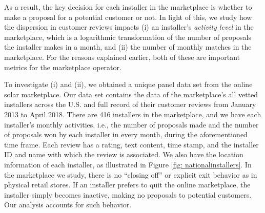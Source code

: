 \documentclass[msom,blindrev]{informs3}
\begin{document}
%	
%	
	
	As a result, the key decision for each installer in the marketplace is whether to make a proposal for a potential customer or not. In light of this, we study how the dispersion in customer reviews impacts (i) an installer's \emph{activity level} in the marketplace, which is a logarithmic transformation of the number of proposals the installer makes in a month, and (ii) the number of monthly matches in the marketplace. For the reasons explained earlier, both of these are important metrics for the marketplace operator.
	
	
	
	To investigate (i) and (ii), we obtained a unique panel data set from the online solar marketplace. Our data set contains the data of the marketplace's all vetted installers across the U.S. and full record of their customer reviews from January 2013 to April 2018. There are 416 installers in the marketplace, and we have each installer's monthly activities, i.e., the number of proposals made and the number of proposals won by each installer in every month, during the aforementioned time frame. Each review has a rating, text content, time stamp, and the installer ID and name with which the review is associated. We also have the location information of each installer, as illustrated in Figure \ref{fig: nationalinstallers}. In the marketplace we study, there is no ``closing off'' or explicit exit behavior as in physical retail stores. If an installer prefers to quit the online marketplace, the installer simply becomes inactive, making no proposals to potential customers. Our analysis accounts for such behavior.
	
	
	
	
\end{document}
